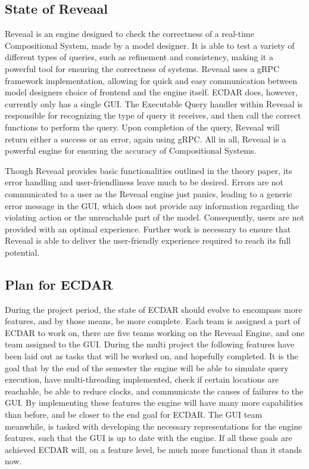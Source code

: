 \subsection{State of Reveaal}
Reveaal is an engine designed to check the correctness of a real-time Compositional System, made by a model designer. It is able to test a variety of different types of queries, such as refinement and consistency, making it a powerful tool for ensuring the correctness of systems. Reveaal uses a gRPC framework implementation, allowing for quick and easy communication between model designers choice of frontend and the engine itself. ECDAR does, however, currently only has a single GUI. The Executable Query handler within Reveaal is responsible for recognizing the type of query it receives, and then call the correct functions to perform the query. Upon completion of the query, Reveaal will return either a success or an error, again using gRPC. All in all, Reveaal is a powerful engine for ensuring the accuracy of Compositional Systems.

Though Reveaal provides basic functionalities outlined in the theory paper, its error handling and user-friendliness leave much to be desired. Errors are not communicated to a user as the Reveaal engine just panics, leading to a generic error message in the GUI, which does not provide any information regarding the violating action or the unreachable part of the model. Consequently, users are not provided with an optimal experience. Further work is necessary to ensure that Reveaal is able to deliver the user-friendly experience required to reach its full potential.

\subsection{Plan for ECDAR} \label{sec:plan-for-ecdar}
During the project period, the state of ECDAR should evolve to encompass more features, and by those means, be more complete. Each team is assigned a part of ECDAR to work on, there are five teams working on the Reveaal Engine, and one team assigned to the GUI. During the multi project the following features have been laid out as tasks that will be worked on, and hopefully completed. It is the goal that by the end of the semester the engine will be able to simulate query execution, have multi-threading implemented, check if certain locations are reachable, be able to reduce clocks, and communicate the causes of failures to the GUI. By implementing these features the engine will have many more capabilities than before, and be closer to the end goal for ECDAR. The GUI team meanwhile, is tasked with developing the necessary representations for the engine features, such that the GUI is up to date with the engine. If all these goals are achieved ECDAR will, on a feature level, be much more functional than it stands now.

